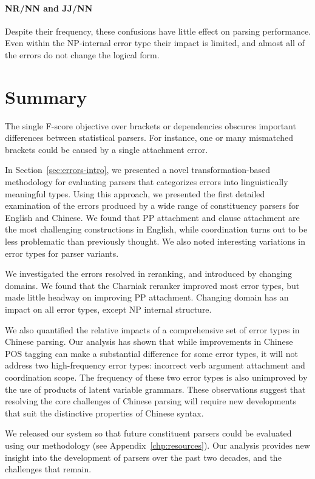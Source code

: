 \paragraph{NR/NN and JJ/NN}  Despite their frequency, these confusions have
little effect on parsing performance.  Even within the NP-internal error type
their impact is limited, and almost all of the errors do not change the
logical form.

\section{Summary}

The single F-score objective over brackets or dependencies obscures important differences between statistical parsers.
For instance, one or many mismatched brackets could be caused by a single attachment error.

In Section~\ref{sec:errors-intro}, we presented a novel transformation-based methodology for
evaluating parsers that categorizes errors into linguistically meaningful
types.  Using this approach, we presented the first detailed examination of the
errors produced by a wide range of constituency parsers for
English and Chinese.  We found that PP attachment and clause attachment are the most
challenging constructions in English, while coordination turns out to be less problematic
than previously thought.  We also noted interesting variations in error types
for parser variants.

We investigated the errors resolved in reranking, and introduced by changing
domains. We found that the Charniak reranker improved most error types, but
made little headway on improving PP attachment.  Changing domain has an impact
on all error types, except NP internal structure.

We also quantified the relative impacts of a comprehensive set of error types
in Chinese parsing.  Our analysis has shown that while improvements in
Chinese POS tagging can make a substantial difference for some error types,
it will not address two high-frequency error types: incorrect verb argument
attachment and coordination scope.  The frequency of these two error types is
also unimproved by the use of products of latent variable grammars.  These
observations suggest that resolving the core challenges of Chinese parsing
will require new developments that suit the distinctive properties of Chinese
syntax.

We released our system so that future constituent parsers could be evaluated using our methodology (see Appendix~\ref{chp:resources}).
Our analysis provides new insight into the development of parsers over the past two decades, and the challenges that remain.


